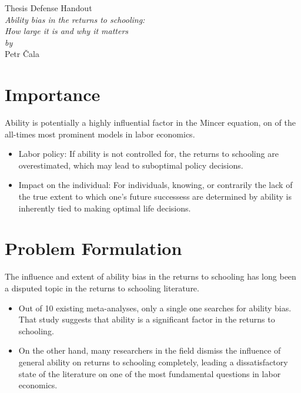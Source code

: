 \documentclass[12pt]{article}
\begin{document}
\begin{center}
    \large{Thesis Defense Handout \\  \vspace{0.5cm}\Large \textit{Ability bias in the returns to schooling:\\\smallskip How large it is and why it matters}}\\
    \vspace{0.2cm}
    \normalsize{\textit{by}\\}
    \vspace{0.1cm}
    \large{Petr \v{C}ala}
\end{center}
% 

\section*{Importance}
Ability is potentially a highly influential factor in the Mincer equation, on of the all-times most prominent models in labor economics.
\begin{itemize}
    \item Labor policy: If ability is not controlled for, the returns to schooling are overestimated, which may lead to suboptimal policy decisions.
    \item Impact on the individual: For individuals, knowing, or contrarily the lack of the true extent to which one's future successess are determined by ability is inherently tied to making optimal life decisions.
\end{itemize}

\section*{Problem Formulation}

The influence and extent of ability bias in the returns to schooling has long been a disputed topic in the returns to schooling literature.

\begin{itemize}
    \item Out of 10 existing meta-analyses, only a single one searches for ability bias. That study suggests that ability is a significant factor in the returns to schooling.
    \item On the other hand, many researchers in the field dismiss the influence of general ability on returns to schooling completely, leading a dissatisfactory state of the literature on one of the most fundamental questions in labor economics.

\end{itemize}
\clearpage
\end{document}
